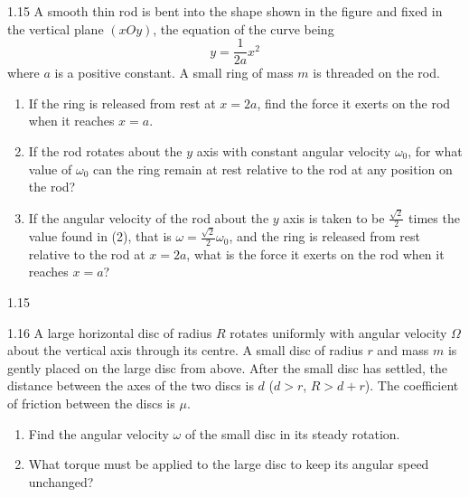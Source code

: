 \begin{problem}{1.15}
A smooth thin rod is bent into the shape shown in the figure and fixed in the vertical plane $(xOy)$, the equation of the curve being
\[
y=\dfrac{1}{2a}x^2
\]
where $a$ is a positive constant. A small ring of mass $m$ is threaded on the rod.
\begin{enumerate}[label=(\arabic*),leftmargin=2.2em,itemsep=1pt,topsep=2pt]
\item If the ring is released from rest at $x=2a$, find the force it exerts on the rod when it reaches $x=a$.
\item If the rod rotates about the $y$ axis with constant angular velocity $\omega_0$, for what value of $\omega_0$ can the ring remain at rest relative to the rod at any position on the rod?
\item If the angular velocity of the rod about the $y$ axis is taken to be $\frac{\sqrt2}{2}$ times the value found in (2), that is $\omega=\frac{\sqrt2}{2}\omega_0$, and the ring is released from rest relative to the rod at $x=2a$, what is the force it exerts on the rod when it reaches $x=a$?
\end{enumerate}
\end{problem}

\begin{figbox}{1.15}
\end{figbox}

\begin{problem}{1.16}
A large horizontal disc of radius $R$ rotates uniformly with angular velocity $\Omega$ about the vertical axis through its centre. A small disc of radius $r$ and mass $m$ is gently placed on the large disc from above. After the small disc has settled, the distance between the axes of the two discs is $d$ ($d>r$, $R>d+r$). The coefficient of friction between the discs is $\mu$.
\begin{enumerate}[label=(\arabic*),leftmargin=2.2em,itemsep=1pt,topsep=2pt]
\item Find the angular velocity $\omega$ of the small disc in its steady rotation.
\item What torque must be applied to the large disc to keep its angular speed unchanged?
\end{enumerate}
\end{problem}

